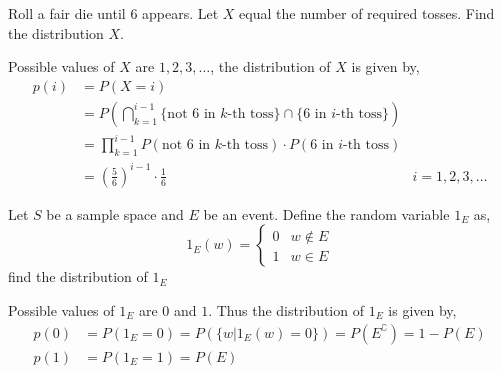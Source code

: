 \begin{example}
    Roll a fair die until $6$ appears. Let $X$ equal the number of required
tosses. Find the distribution $X$.
\end{example}
\begin{solution}
    Possible values of $X$ are $1, 2, 3, \dots$, the distribution of $X$ is
given by, 
\begin{align*}
    p(i) &= P(X = i)                                                         \\
         &= P(\bigcap_{k=1}^{i-1} \lbrace \text{not $6$ in $k$-th toss} \rbrace
            \cap \lbrace \text{$6$ in $i$-th toss} \rbrace)                  \\
         &= \prod_{k=1}^{i-1} P(\text{not $6$ in $k$-th toss}) \cdot
            P(\text{$6$ in $i$-th toss})                                     \\
         &= (\frac{5}{6})^{i-1} \cdot \frac{1}{6}          & i = 1, 2, 3, \dots
\end{align*}
\end{solution}

\begin{example}
    Let $S$ be a sample space and $E$ be an event. Define the random variable
$1_E$ as, 
\begin{equation*}
    1_E(w) = \begin{cases}
        0 & w \notin E                                                      \\
        1 & w \in E 
    \end{cases}
\end{equation*}
find the distribution of $1_E$
\end{example}
\begin{solution}
    Possible values of $1_E$ are $0$ and $1$. Thus the distribution of $1_E$ is
given by, 
\begin{align*}
    p(0) &= P(1_E = 0)
          = P(\lbrace w \vert 1_E(w) = 0\rbrace)
          = P(E^\complement) 
          = 1 - P(E)                                                         \\
    p(1) &= P(1_E = 1) = P(E)
\end{align*}
\end{solution}

